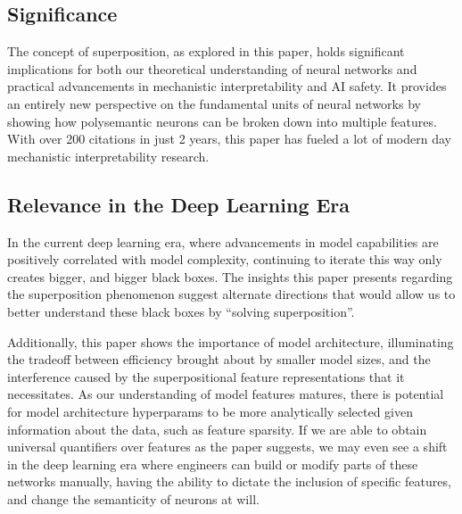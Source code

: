 
\subsection{Significance}

The concept of superposition, as explored in this paper, holds significant implications for both our theoretical understanding of neural networks and practical advancements in mechanistic interpretability and AI safety.
It provides an entirely new perspective on the fundamental units of neural networks by showing how polysemantic neurons can be broken down into multiple features.
With over 200 citations in just 2 years, this paper has fueled a lot of modern day mechanistic interpretability research.

\subsection{Relevance in the Deep Learning Era}

In the current deep learning era, where advancements in model capabilities are positively correlated with model complexity, continuing to iterate this way only creates bigger, and bigger black boxes.
The insights this paper presents regarding the superposition phenomenon suggest alternate directions that would allow us to better understand these black boxes by ``solving superposition''.

Additionally, this paper shows the importance of model architecture, illuminating the tradeoff between efficiency brought about by smaller model sizes, and the interference caused by the superpositional feature representations that it necessitates.
As our understanding of model features matures, there is potential for model architecture hyperparams to be more analytically selected given information about the data, such as feature sparsity.
If we are able to obtain universal quantifiers over features as the paper suggests, we may even see a shift in the deep learning era where engineers can build or modify parts of these networks manually, having the ability to dictate the inclusion of specific features, and change the semanticity of neurons at will.
